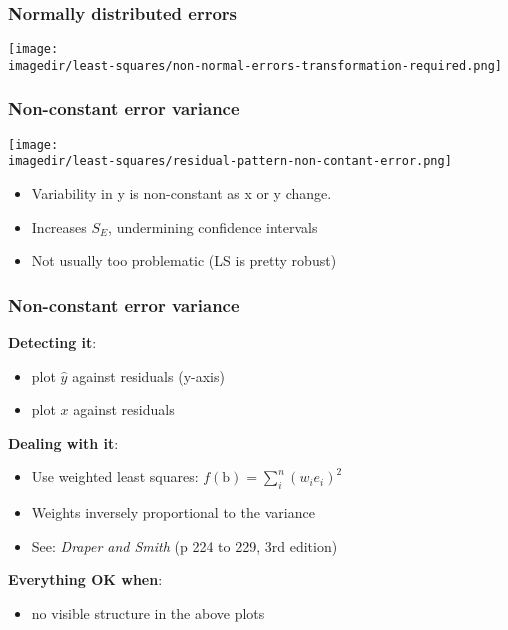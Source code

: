 \begin{frame}\frametitle{Normally distributed errors}
	\begin{center}
		\texttt{[image: \\imagedir/least-squares/non-normal-errors-transformation-required.png]}
	\end{center}
\end{frame}

\begin{frame}\frametitle{Non-constant error variance}
	\begin{center}
		\texttt{[image: \\imagedir/least-squares/residual-pattern-non-contant-error.png]}
	\end{center}
	\begin{itemize}
		\item	Variability in y is non-constant as x or y change.
		\item	Increases $S_E$, undermining confidence intervals
		\item	Not usually too problematic (LS is pretty robust)
	\end{itemize}
\end{frame}

\begin{frame}\frametitle{Non-constant error variance}

	\textbf{Detecting it}:
	\begin{itemize}
		\item	plot $\hat{y}$ against residuals (y-axis)
		\item	plot $x$ against residuals
	\end{itemize}

	\textbf{Dealing with it}:
	\begin{itemize}
		\item	Use weighted least squares: $f(\mathrm{b}) = \sum_i^n{(w_ie_i)^2}$
		\item	Weights inversely proportional to the variance
		\item	See: \emph{Draper and Smith} (p 224 to 229, 3rd edition)
	\end{itemize}

	\textbf{Everything OK when}:
	\begin{itemize}
		\item	no visible structure in the above plots
	\end{itemize}
\end{frame}

